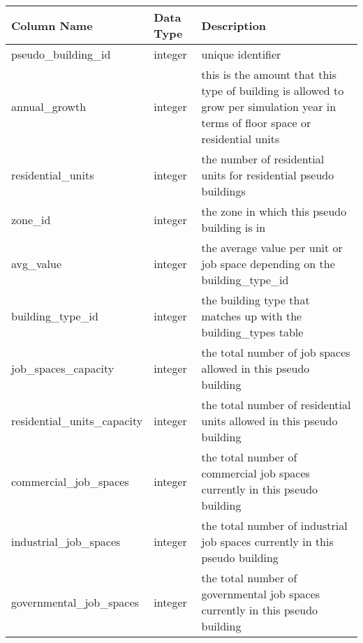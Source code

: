 \begin{tabular}{p{2.3in}lp{3.2in}}
\textbf{Column Name} & \textbf{Data Type} & \textbf{Description} \\
\hline
pseudo\_building\_id & integer & unique identifier\\ \hline
annual\_growth & integer & this is the amount that this type of building is allowed to grow per simulation year in terms of floor space or residential units\\ \hline
residential\_units & integer & the number of residential units for residential pseudo buildings\\ \hline
zone\_id & integer & the zone in which this pseudo building is in\\ \hline
avg\_value & integer & the average value per unit or job space depending on the building\_type\_id\\ \hline
building\_type\_id & integer & the building type that matches up with the building\_types table\\ \hline
job\_spaces\_capacity & integer & the total number of job spaces allowed in this pseudo building\\ \hline
residential\_units\_capacity & integer & the total number of residential units allowed in this pseudo building\\ \hline
commercial\_job\_spaces & integer & the total number of commercial job spaces currently in this pseudo building\\ \hline
industrial\_job\_spaces & integer & the total number of industrial job spaces currently in this pseudo building\\ \hline
governmental\_job\_spaces & integer & the total number of governmental job spaces currently in this pseudo building\\ \hline
\end{tabular}